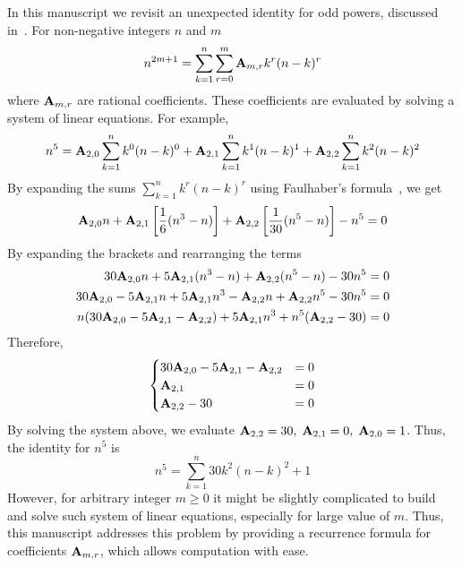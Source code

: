 In this manuscript we revisit an unexpected identity for odd powers, discussed in~\cite{unusual_identity_for_odd_powers}.
For non-negative integers $n$ and $m$
\begin{equation}
    n^{2m+1} = \sum_{k=1}^{n} \sum_{r=0}^{m} {\mathbf{A}} \sb{m,r} k^r (n-k)^r
    \label{eq:odd-power-identity}
\end{equation}
where ${\mathbf{A}} \sb{m,r}$ are rational coefficients.
These coefficients are evaluated by solving a system of linear equations.
For example,
\begin{align*}
    n^5 = {\mathbf{A}} \sb{2,0} \sum_{k=1}^{n} k^0 (n-k)^0 + {\mathbf{A}} \sb{2,1} \sum_{k=1}^{n} k^1 (n-k)^1 + {\mathbf{A}} \sb{2,2} \sum_{k=1}^{n} k^2 (n-k)^2
\end{align*}
By expanding the sums $\sum_{k=1}^{n} k^r (n-k)^r$ using Faulhaber's formula~\cite{beardon1996sums}, we get
\begin{equation*}
    {\mathbf{A}} \sb{2,0} n
    + {\mathbf{A}} \sb{2,1} \left[ \frac{1}{6} (n^3-n) \right]
    + {\mathbf{A}} \sb{2,2} \left[ \frac{1}{30} (n^5-n) \right] - n^5 = 0
\end{equation*}
By expanding the brackets and rearranging the terms
\begin{align*}
    30 {\mathbf{A}} \sb{2,0} n + 5 {\mathbf{A}} \sb{2,1} (n^3-n) + {\mathbf{A}} \sb{2,2} (n^5-n) - 30n^5 = 0 \\
    30 {\mathbf{A}} \sb{2,0} - 5 {\mathbf{A}} \sb{2,1} n + 5 {\mathbf{A}} \sb{2,1} n^3 - {\mathbf{A}} \sb{2,2} n + {\mathbf{A}} \sb{2,2} n^5 - 30n^5 = 0 \\
    n (30 {\mathbf{A}} \sb{2,0} - 5 {\mathbf{A}} \sb{2,1} - {\mathbf{A}} \sb{2,2}) + 5 {\mathbf{A}} \sb{2,1} n^3 + n^5 ({\mathbf{A}} \sb{2,2} - 30) = 0
\end{align*}
Therefore,
\begin{equation*}
    \begin{cases}
        30 {\mathbf{A}} \sb{2,0} - 5 {\mathbf{A}} \sb{2,1} - {\mathbf{A}} \sb{2,2} &= 0 \\
        {\mathbf{A}} \sb{2,1} &= 0 \\
        {\mathbf{A}} \sb{2,2} - 30 &= 0
    \end{cases}
\end{equation*}
By solving the system above, we evaluate ${\mathbf{A}} \sb{2,2}=30, \; {\mathbf{A}} \sb{2,1} =0, \; {\mathbf{A}} \sb{2,0} = 1$.
Thus, the identity for $n^5$ is
\begin{equation*}
    n^5 = \sum_{k=1}^{n} 30k^2(n-k)^2 + 1
\end{equation*}
However, for arbitrary integer $m\geq 0$ it might be slightly complicated
to build and solve such system of linear equations,
especially for large value of $m$.
Thus, this manuscript addresses this problem by providing a recurrence formula for coefficients ${\mathbf{A}} \sb{m,r}$,
which allows computation with ease.
